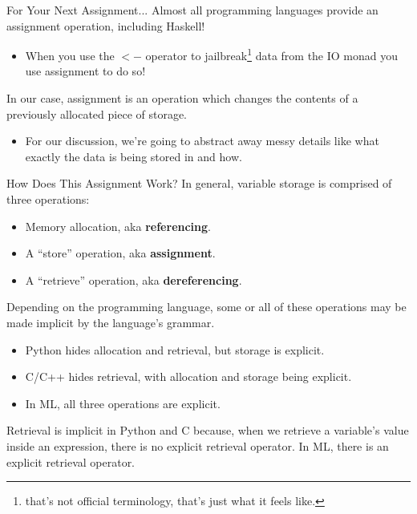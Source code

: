 \documentclass[11pt]{beamer}
\begin{document}
\begin{frame}[fragile=singleslide]{For Your Next Assignment...}
Almost all programming languages provide an assignment operation, including Haskell! 
\begin{itemize}
\item When you use the \texttt{$<-$} operator to jailbreak\footnote{that's not official terminology, that's just what it feels like.} data from the IO monad you use assignment to do so! 
\end{itemize}
In our case, assignment is an operation which changes the contents of a previously allocated piece of storage.
\begin{itemize}
\item For our discussion, we're going to abstract away messy details like what exactly the data is being stored in and how. 
\end{itemize}
\end{frame}


\begin{frame}[fragile=singleslide]{How Does This Assignment Work?}
In general, variable storage is comprised of three operations:
\begin{itemize}
\item Memory allocation, aka \textbf{referencing}.
\item A ``store'' operation, aka \textbf{assignment}.
\item A ``retrieve'' operation, aka \textbf{dereferencing}.
\end{itemize}
Depending on the programming language, some or all of these operations may be made implicit by the language's grammar.
\begin{itemize}
\item Python hides allocation and retrieval, but storage is explicit.
\item C/C++ hides retrieval, with allocation and storage being explicit.
\item In ML, all three operations are explicit.  
\end{itemize}
Retrieval is implicit in Python and C because, when we retrieve a variable's value inside an expression, there is no explicit retrieval operator.  In ML, there is an explicit retrieval operator.  
\end{frame}
\end{document}
